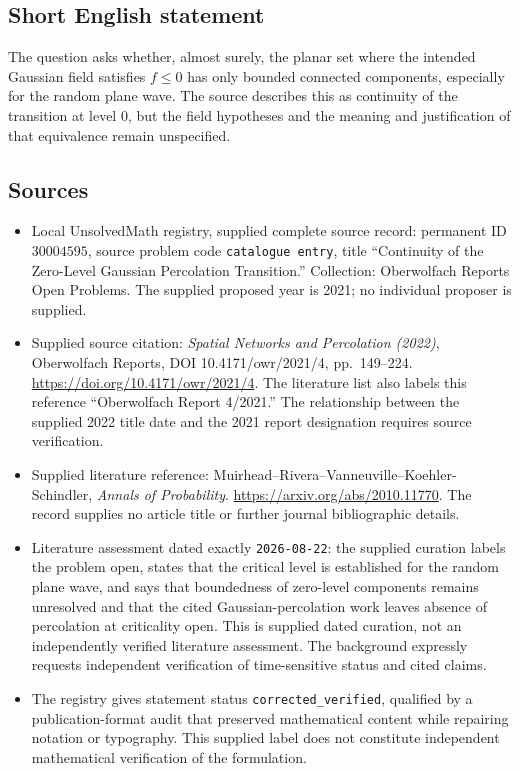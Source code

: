 \documentclass[11pt]{article}
\begin{document}
\subsection{Short English statement}
The question asks whether, almost surely, the planar set where the intended Gaussian field satisfies \(f\leq 0\) has only bounded connected components, especially for the random plane wave. The source describes this as continuity of the transition at level \(0\), but the field hypotheses and the meaning and justification of that equivalence remain unspecified.
\subsection{Sources}
\begin{itemize}
\item Local UnsolvedMath registry, supplied complete source record: permanent ID \(30004595\), source problem code \texttt{catalogue entry}, title ``Continuity of the Zero-Level Gaussian Percolation Transition.'' Collection: Oberwolfach Reports Open Problems. The supplied proposed year is 2021; no individual proposer is supplied.
\item Supplied source citation: \emph{Spatial Networks and Percolation (2022)}, Oberwolfach Reports, DOI 10.4171/owr/2021/4, pp.\ 149--224. \url{https://doi.org/10.4171/owr/2021/4}. The literature list also labels this reference ``Oberwolfach Report 4/2021.'' The relationship between the supplied 2022 title date and the 2021 report designation requires source verification.
\item Supplied literature reference: Muirhead--Rivera--Vanneuville--Koehler-Schindler, \emph{Annals of Probability}. \url{https://arxiv.org/abs/2010.11770}. The record supplies no article title or further journal bibliographic details.
\item Literature assessment dated exactly \texttt{2026-08-22}: the supplied curation labels the problem open, states that the critical level is established for the random plane wave, and says that boundedness of zero-level components remains unresolved and that the cited Gaussian-percolation work leaves absence of percolation at criticality open. This is supplied dated curation, not an independently verified literature assessment. The background expressly requests independent verification of time-sensitive status and cited claims.
\item The registry gives statement status \texttt{corrected\_verified}, qualified by a publication-format audit that preserved mathematical content while repairing notation or typography. This supplied label does not constitute independent mathematical verification of the formulation.
\end{itemize}
\end{document}
